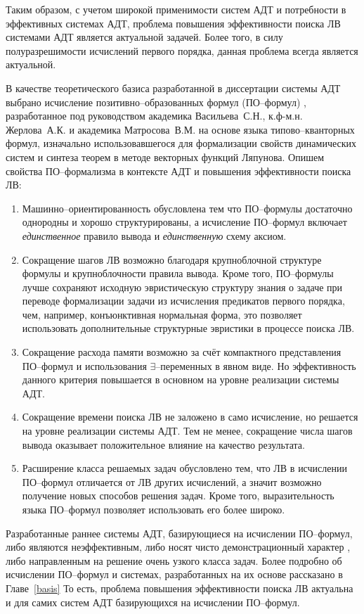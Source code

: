 Таким образом, с учетом широкой применимости систем АДТ и потребности в эффективных системах АДТ, проблема повышения эффективности поиска ЛВ системами АДТ является актуальной задачей. Более того, в силу полуразрешимости исчислений первого порядка, данная проблема всегда является актуальной.

В качестве теоретического базиса разработанной в диссертации системы АДТ выбрано исчисление позитивно--образованных формул (ПО--формул) \cite{ICDS2000, Vas1995}, разработанное под руководством академика Васильева~С.Н., к.ф-м.н. Жерлова~А.К. и академика Матросова~В.М. на основе языка типово--кванторных формул, изначально использовавшегося для формализации свойств динамических систем и синтеза теорем в методе векторных функций Ляпунова. Опишем свойства ПО--формализма в контексте АДТ и повышения эффективности поиска ЛВ:
\begin{enumerate}
\item {Машинно--ориентированность} обусловлена тем что ПО--формулы достаточно однородны и хорошо структурированы, а исчисление ПО--формул включает \emph{единственное} правило вывода и \emph{единственную} схему аксиом.
\item {Сокращение шагов ЛВ} возможно благодаря крупноблочной структуре формулы и крупноблочности правила вывода. Кроме того, ПО--формулы лучше сохраняют исходную эвристическую структуру знания о задаче при переводе формализации задачи из исчисления предикатов первого порядка, чем, например, конъюнктивная нормальная форма, это позволяет использовать дополнительные структурные эвристики в процессе поиска ЛВ.
\item {Сокращение расхода памяти} возможно за счёт компактного представления ПО--формул и использования $\exists$--переменных в явном виде. Но эффективность данного критерия повышается в основном на уровне реализации системы АДТ.
\item {Сокращение времени поиска ЛВ} не заложено в само исчисление, но решается на уровне реализации системы АДТ. Тем не менее, сокращение числа шагов вывода оказывает положительное влияние на качество результата.
\item {Расширение класса решаемых задач} обусловлено тем, что ЛВ в исчислении ПО--формул отличается от ЛВ других исчислений, а значит возможно получение новых способов решения задач. Кроме того, выразительность языка ПО--формул позволяет использовать его более широко. %
\end{enumerate}

Разработанные раннее системы АДТ, базирующиеся на исчислении ПО--формул, либо являются неэффективным, либо носят чисто демонстрационный характер \cite{dissChe}, либо направленным на решение очень узкого класса задач. Более подробно об исчислении ПО--формул и системах, разработанных на их основе рассказано в Главе~\ref{basis} То есть, проблема повышения эффективности поиска ЛВ актуальна и для самих систем АДТ базирующихся на исчислении ПО--формул.

